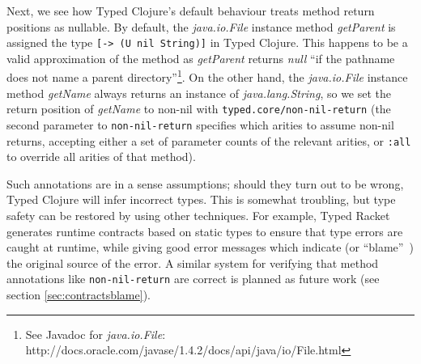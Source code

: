 Next, we see how Typed Clojure's default behaviour treats method return positions as nullable.
By default, the \emph{java.io.File} instance method \emph{getParent}
is assigned the type \lstinline|[-> (U nil String)]| in Typed Clojure. This happens to be
a valid approximation of the method as \emph{getParent} returns \emph{null} 
``if the pathname does not name a parent directory''\footnote{See Javadoc for \emph{java.io.File}: http://docs.oracle.com/javase/1.4.2/docs/api/java/io/File.html}.
On the other hand, the \emph{java.io.File} instance method \emph{getName} always returns an
instance of \emph{java.lang.String}, so we set the return position of
\emph{getName} to non-nil with \lstinline|typed.core/non-nil-return|
(the second parameter to \lstinline|non-nil-return| specifies which arities to assume non-nil 
returns, accepting either a set of parameter counts of the relevant arities, or \lstinline|:all|
to override all arities of that method).

Such annotations are in a sense assumptions; should they turn out to be wrong, Typed Clojure
will infer incorrect types. 
This is somewhat troubling, but type safety can be restored by using other techniques.
For example, Typed Racket generates runtime contracts based on static types to ensure
that type errors are caught at runtime, while giving good error messages 
which indicate (or ``blame''~\cite{WF09}) the original source of the error.
A similar system for verifying that method annotations like \lstinline|non-nil-return|
are correct is planned as future work
(see section \ref{sec:contractsblame}).
